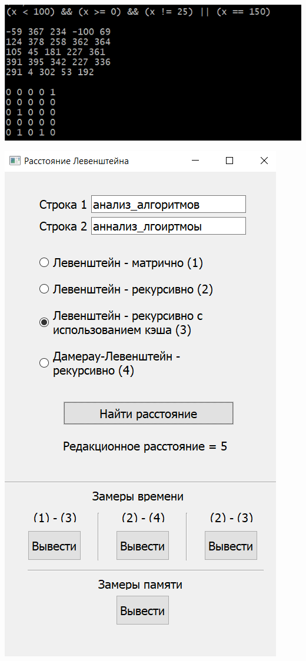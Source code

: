 \begin{minipage}{.49\textwidth}
	\centering
	\includegraphics[scale=0.6]{inc/img/example_1.png}
	\label{example_1}
\end{minipage}
\begin{minipage}{.49\textwidth}
	\centering
	\includegraphics[scale=0.6]{inc/img/example_2.png}
	\label{example_2}
\end{minipage}

